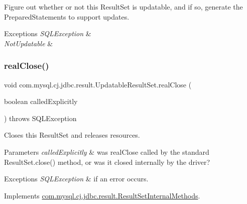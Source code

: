 Figure out whether or not this Result\+Set is updatable, and if so, generate the Prepared\+Statements to support updates.


\begin{DoxyExceptions}{Exceptions}
{\em S\+Q\+L\+Exception} & \\
\hline
{\em Not\+Updatable} & \\
\hline
\end{DoxyExceptions}
\mbox{\label{classcom_1_1mysql_1_1cj_1_1jdbc_1_1result_1_1_updatable_result_set_aa7c422ba94c2a8a8727c57160bd946bd}} 
\subsubsection{\texorpdfstring{real\+Close()}{realClose()}}
{\footnotesize\ttfamily void com.\+mysql.\+cj.\+jdbc.\+result.\+Updatable\+Result\+Set.\+real\+Close (\begin{DoxyParamCaption}\item[{boolean}]{called\+Explicitly }\end{DoxyParamCaption}) throws S\+Q\+L\+Exception}

Closes this Result\+Set and releases resources.


\begin{DoxyParams}{Parameters}
{\em called\+Explicitly} & was real\+Close called by the standard Result\+Set.\+close() method, or was it closed internally by the driver?\\
\hline
\end{DoxyParams}

\begin{DoxyExceptions}{Exceptions}
{\em S\+Q\+L\+Exception} & if an error occurs. \\
\hline
\end{DoxyExceptions}


Implements \mbox{\hyperlink{interfacecom_1_1mysql_1_1cj_1_1jdbc_1_1result_1_1_result_set_internal_methods_a0102042bd0710772308db537f40e2286}{com.\+mysql.\+cj.\+jdbc.\+result.\+Result\+Set\+Internal\+Methods}}.

\mbox{\label{classcom_1_1mysql_1_1cj_1_1jdbc_1_1result_1_1_updatable_result_set_aa98341ec11939c41a5cd519d23fb055e}} 
